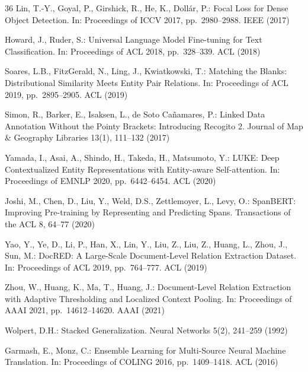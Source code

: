 \documentclass[11pt,a4paper]{article}
\begin{document}
\begin{thebibliography}{36}
Lin, T.-Y., Goyal, P., Girshick, R., He, K., Doll\'ar, P.:
Focal Loss for Dense Object Detection.
In: Proceedings of ICCV 2017, pp.~2980--2988. IEEE (2017)

Howard, J., Ruder, S.:
Universal Language Model Fine-tuning for Text Classification.
In: Proceedings of ACL 2018, pp.~328--339. ACL (2018)

Soares, L.B., FitzGerald, N., Ling, J., Kwiatkowski, T.:
Matching the Blanks: Distributional Similarity Meets Entity Pair Relations.
In: Proceedings of ACL 2019, pp.~2895--2905. ACL (2019)

Simon, R., Barker, E., Isaksen, L., de Soto Ca\~namares, P.:
Linked Data Annotation Without the Pointy Brackets: Introducing Recogito 2.
Journal of Map \& Geography Libraries 13(1), 111--132 (2017)


Yamada, I., Asai, A., Shindo, H., Takeda, H., Matsumoto, Y.:
LUKE: Deep Contextualized Entity Representations with Entity-aware Self-attention.
In: Proceedings of EMNLP 2020, pp.~6442--6454. ACL (2020)

Joshi, M., Chen, D., Liu, Y., Weld, D.S., Zettlemoyer, L., Levy, O.:
SpanBERT: Improving Pre-training by Representing and Predicting Spans.
Transactions of the ACL 8, 64--77 (2020)

Yao, Y., Ye, D., Li, P., Han, X., Lin, Y., Liu, Z., Liu, Z., Huang, L., Zhou, J., Sun, M.:
DocRED: A Large-Scale Document-Level Relation Extraction Dataset.
In: Proceedings of ACL 2019, pp.~764--777. ACL (2019)

Zhou, W., Huang, K., Ma, T., Huang, J.:
Document-Level Relation Extraction with Adaptive Thresholding and Localized Context Pooling.
In: Proceedings of AAAI 2021, pp.~14612--14620. AAAI (2021)


Wolpert, D.H.:
Stacked Generalization.
Neural Networks 5(2), 241--259 (1992)

Garmash, E., Monz, C.:
Ensemble Learning for Multi-Source Neural Machine Translation.
In: Proceedings of COLING 2016, pp.~1409--1418. ACL (2016)


\end{thebibliography}
\end{document}
